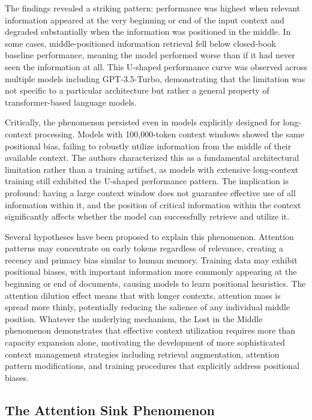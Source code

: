 The findings revealed a striking pattern: performance was highest when relevant information appeared at the very beginning or end of the input context and degraded substantially when the information was positioned in the middle. In some cases, middle-positioned information retrieval fell below closed-book baseline performance, meaning the model performed worse than if it had never seen the information at all. This U-shaped performance curve was observed across multiple models including GPT-3.5-Turbo, demonstrating that the limitation was not specific to a particular architecture but rather a general property of transformer-based language models.

Critically, the phenomenon persisted even in models explicitly designed for long-context processing. Models with 100,000-token context windows showed the same positional bias, failing to robustly utilize information from the middle of their available context. The authors characterized this as a fundamental architectural limitation rather than a training artifact, as models with extensive long-context training still exhibited the U-shaped performance pattern. The implication is profound: having a large context window does not guarantee effective use of all information within it, and the position of critical information within the context significantly affects whether the model can successfully retrieve and utilize it.

Several hypotheses have been proposed to explain this phenomenon. Attention patterns may concentrate on early tokens regardless of relevance, creating a recency and primacy bias similar to human memory. Training data may exhibit positional biases, with important information more commonly appearing at the beginning or end of documents, causing models to learn positional heuristics. The attention dilution effect means that with longer contexts, attention mass is spread more thinly, potentially reducing the salience of any individual middle position. Whatever the underlying mechanism, the Lost in the Middle phenomenon demonstrates that effective context utilization requires more than capacity expansion alone, motivating the development of more sophisticated context management strategies including retrieval augmentation, attention pattern modifications, and training procedures that explicitly address positional biases.

\subsection{The Attention Sink Phenomenon}

